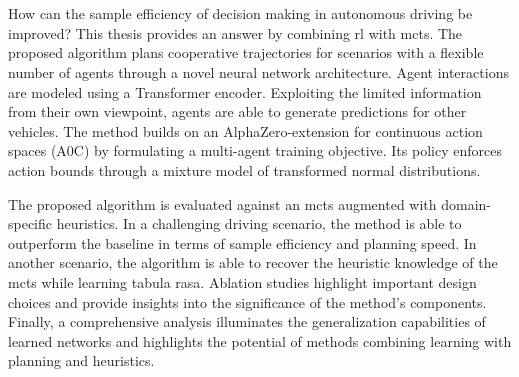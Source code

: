 \thispagestyle{empty}\section*{}
How can the sample efficiency of decision making in autonomous driving be improved? This thesis provides an answer by combining \gls{rl} with \gls{mcts}. The proposed algorithm plans cooperative trajectories for scenarios with a flexible number of agents through a novel neural network architecture. Agent interactions are modeled using a Transformer encoder. Exploiting the limited information from their own viewpoint, agents are able to generate predictions for other vehicles. The method builds on an AlphaZero-extension for continuous action spaces (A0C) by formulating a multi-agent training objective. Its policy enforces action bounds through a mixture model of transformed normal distributions.

The proposed algorithm is evaluated against an \gls{mcts} augmented with domain-specific heuristics. In a challenging driving scenario, the method is able to outperform the baseline in terms of sample efficiency and planning speed. In another scenario, the algorithm is able to recover the heuristic knowledge of the \gls{mcts} while learning tabula rasa. Ablation studies highlight important design choices and provide insights into the significance of the method's components. Finally, a comprehensive analysis illuminates the generalization capabilities of learned networks and highlights the potential of methods combining learning with planning and heuristics.